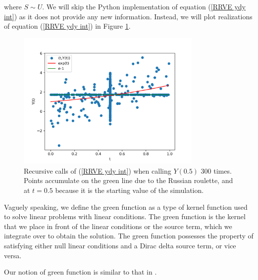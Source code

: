 \documentclass[a4paper,12pt]{article}
\begin{document}
\begin{example}[$y'=y$ average condition]
    where $S \sim U$. We will skip the Python implementation
    of equation (\ref{RRVE ydy int}) as it does not provide any
    new information. Instead, we will plot realizations of
    equation (\ref{RRVE ydy int}) in Figure \ref{fig:ydy int}.

    \begin{figure}[h!]
        \centering
        \includegraphics[width=0.8\textwidth]{plots/ydy int.png}
        \caption{Recursive calls of (\ref{RRVE ydy int}) when
            calling $Y(0.5)$ $300$ times. Points accumulate on
            the green line due to the Russian roulette,
            and at  $t=0.5$ because it is the starting
            value of the simulation.
        }
        \label{fig:ydy int}
    \end{figure}

\end{example}

\begin{definition}
    Vaguely speaking, we define the green function as a type
    of kernel function used to solve linear problems with linear
    conditions. The green function is the kernel that we
    place in front of the linear conditions or the source term,
    which we integrate over to obtain the solution. The green
    function possesses the property of satisfying either null
    linear conditions and a Dirac delta source term, or vice versa.
\end{definition}

\begin{related}
    Our notion of green function is similar to that in \cite{hwang_simulationtabulation_2001}.
\end{related}
\end{document}
